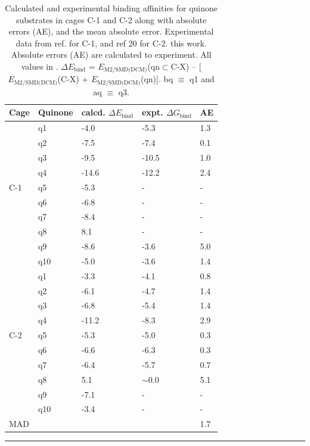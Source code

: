 \documentclass[../../main.tex]{subfiles}
\begin{document}
\begin{table}[h!]
	\def\arraystretch{1.7}
	\begin{tabularx}{\textwidth}{YYYYY}
		\hline	
		Cage&	Quinone	&calcd. $\Delta E_\text{bind}$	&expt.  $\Delta G_\text{bind}$&	AE \\
		\hline
		
		&q1	&-4.0&	-5.3&	1.3
\\
		&q2&	-7.5&	-7.4&	0.1
\\
		&q3&	-9.5&	-10.5&	1.0
\\
		&q4	&-14.6&	-12.2&	2.4
\\
	C-1 	&	q5&	-5.3&	-&	-
\\
 		&q6	&-6.8&	-&	-
\\
	&	q7	&-8.4&	-&	-
\\
	&	q8	&8.1&	-	&-
\\
	&	q9	&-8.6&	-3.6&	5.0
\\
		&q10&	-5.0&	-3.6	&1.4
\\
		
		&	q1&	-3.3&	-4.1&	0.8
\\
		&q2&	-6.1&	-4.7&	1.4
\\
		&	q3&	-6.8&	-5.4&	1.4
\\
		&	q4	&-11.2&-8.3	&2.9
\\
	C-2	&	q5&	-5.3&	-5.0&	0.3
\\
		&	q6	&-6.6&	-6.3&	0.3
\\
		&	q7	&-6.4&	-5.7&	0.7
\\
		&q8	&5.1	&    $\sim$0.0	&5.1
\\
		&	q9&	-7.1&	-&	-
\\
		&q10&	-3.4	&-	&-
\\
		MAD		&&&	&	1.7
\\

	\end{tabularx}
	\hrule
	\vspace{0.2cm}
	\caption{Calculated and experimental binding affinities for quinone substrates in cages C-1 and C-2 along with absolute errors (AE), and the mean absolute error. Experimental data from ref. \cite{August2016} for C-1, and ref 20 for C-2. this work. Absolute errors (AE) are calculated to experiment. All values in \kcal. $\Delta E_\text{bind}$ = $E_\text{M2/SMD(DCM)}$(qn$\subset$C-X) – [$E_\text{M2/SMD(DCM)}$(C-X) + $E_\text{M2/SMD(DCM)}$(qn)]. bq $\equiv$ q1 and aq $\equiv$ q3.}
	\label{table::si_da_8}
\end{table}
\end{document}
